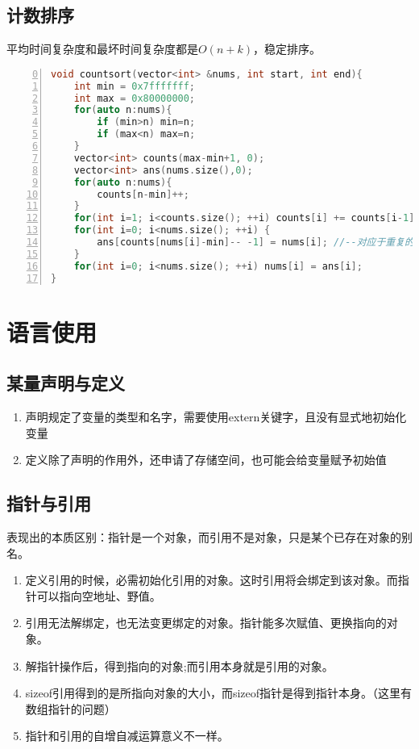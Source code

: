 \subsection{计数排序}
平均时间复杂度和最坏时间复杂度都是$O(n+k)$，稳定排序。
\begin{lstlisting}[language=c++,numbers=left,firstnumber = 0,numberstyle=\tiny,breaklines = true,keywordstyle=\color{blue!70},commentstyle=\color{red!50!green!50!blue!50},frame=shadowbox, rulesepcolor=\color{red!20!green!20!blue!20}]
void countsort(vector<int> &nums, int start, int end){
    int min = 0x7fffffff;
    int max = 0x80000000;
    for(auto n:nums){
        if (min>n) min=n;
        if (max<n) max=n;
    }
    vector<int> counts(max-min+1, 0);
    vector<int> ans(nums.size(),0);
    for(auto n:nums){
        counts[n-min]++;
    }
    for(int i=1; i<counts.size(); ++i) counts[i] += counts[i-1];
    for(int i=0; i<nums.size(); ++i) {
        ans[counts[nums[i]-min]-- -1] = nums[i]; //--对应于重复的数字
    }
    for(int i=0; i<nums.size(); ++i) nums[i] = ans[i];
}
\end{lstlisting}




\section{语言使用}
\subsection{某量声明与定义}
\begin{enumerate}
\item 声明规定了变量的类型和名字，需要使用extern关键字，且没有显式地初始化变量
\item 定义除了声明的作用外，还申请了存储空间，也可能会给变量赋予初始值
\end{enumerate}

\subsection{指针与引用}
表现出的本质区别：指针是一个对象，而引用不是对象，只是某个已存在对象的别名。
\begin{enumerate}
\item 定义引用的时候，必需初始化引用的对象。这时引用将会绑定到该对象。而指针可以指向空地址、野值。
\item 引用无法解绑定，也无法变更绑定的对象。指针能多次赋值、更换指向的对象。
\item 解指针操作后，得到指向的对象;而引用本身就是引用的对象。
\item sizeof引用得到的是所指向对象的大小，而sizeof指针是得到指针本身。（这里有数组指针的问题）
\item 指针和引用的自增自减运算意义不一样。
\end{enumerate}

